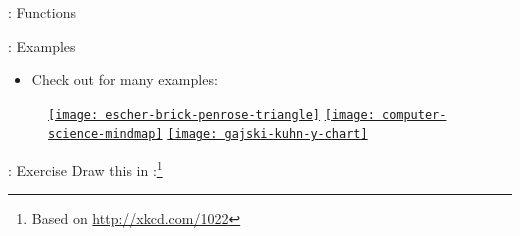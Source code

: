 \documentclass{beamer}
\begin{document}
\begin{frame}[fragile]{\insertsection: Functions}
\end{frame}

\begin{frame}[fragile]{\insertsection: Examples}
\begin{itemize}
\item Check out  for many \tikzname{} examples:
\end{itemize}
\begin{figure}
\href{http://texample.net/tikz/examples/escher-brick-penrose-triangle/}{%
  \texttt{[image: escher-brick-penrose-triangle]}}
\href{http://texample.net/tikz/examples/computer-science-mindmap/}{%
  \texttt{[image: computer-science-mindmap]}}
\href{http://texample.net/tikz/examples/gajski-kuhn-y-chart/}{%
  \texttt{[image: gajski-kuhn-y-chart]}}
\end{figure}
\end{frame}

\begin{frame}[fragile]{\insertsection: Exercise}
Draw this in \tikzname:\footnote{Based on \url{http://xkcd.com/1022}}
\begin{figure}

\end{figure}
\end{frame}
\end{document}
